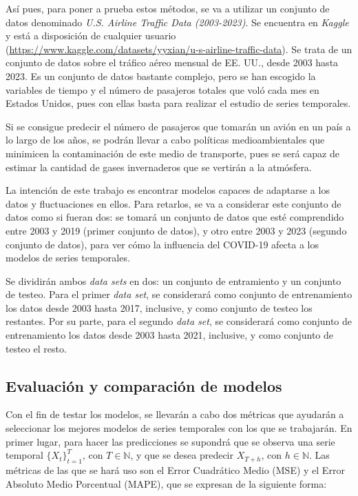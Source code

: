 \documentclass[12pt,twoside]{article}
\begin{document}
Así pues, para poner a prueba estos métodos, se va a utilizar un conjunto de datos denominado \textit{U.S. Airline Traffic Data (2003-2023)}. Se encuentra en \textit{Kaggle} y está a disposición de cualquier usuario (\href{https://www.kaggle.com/datasets/yyxian/u-s-airline-traffic-data}{https://www.kaggle.com/datasets/yyxian/u-s-airline-traffic-data}). Se trata de un conjunto de datos sobre el tráfico aéreo mensual de EE. UU., desde 2003 hasta 2023. Es un conjunto de datos bastante complejo, pero se han escogido la variables de tiempo y el número de pasajeros totales que voló cada mes en Estados Unidos, pues con ellas basta para realizar el estudio de series temporales.

Si se consigue predecir el número de pasajeros que tomarán un avión en un país a lo largo de los años, se podrán llevar a cabo políticas medioambientales que minimicen la contaminación de este medio de transporte, pues se será capaz de estimar la cantidad de gases invernaderos que se vertirán a la atmósfera.

La intención de este trabajo es encontrar modelos capaces de adaptarse a los datos y fluctuaciones en ellos. Para retarlos, se va a considerar este conjunto de datos como si fueran dos: se tomará un conjunto de datos que esté comprendido entre 2003 y 2019 (primer conjunto de datos), y otro entre 2003 y 2023 (segundo conjunto de datos), para ver cómo la influencia del COVID-19 afecta a los modelos de series temporales. 

Se dividirán ambos \textit{data sets} en dos: un conjunto de entramiento y un conjunto de testeo. Para el primer \textit{data set}, se considerará como conjunto de entrenamiento los datos desde 2003 hasta 2017, inclusive, y como conjunto de testeo los restantes. Por su parte, para el segundo \textit{data set}, se considerará como conjunto de entrenamiento los datos desde 2003 hasta 2021, inclusive, y como conjunto de testeo el resto. 

\subsection{Evaluación y comparación de modelos}

Con el fin de testar los modelos, se llevarán a cabo dos métricas que ayudarán a seleccionar los mejores modelos de series temporales con los que se trabajarán. En primer lugar, para hacer las predicciones se supondrá que se observa una serie temporal $\{X_t\}_{t=1}^{T}$, con $T \in \mathbb{N}$, y que se desea predecir $X_{T+h}$, con $h \in \mathbb{N}$. Las métricas de las que se hará uso son el Error Cuadrático Medio (MSE) y el Error Absoluto Medio Porcentual (MAPE), que se expresan de la siguiente forma: 
\end{document}
